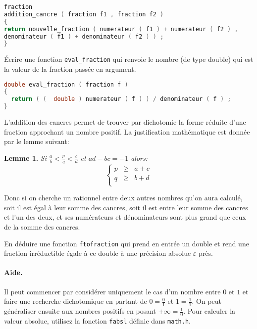 \begin{solutioncachee}
  \begin{lstlisting}[language=C]
fraction
addition_cancre ( fraction f1 , fraction f2 )
{
return nouvelle_fraction ( numerateur ( f1 ) + numerateur ( f2 ) ,
denominateur ( f1 ) + denominateur ( f2 ) ) ;
}
\end{lstlisting}
\end{solutioncachee}

\question Écrire une fonction \texttt{eval\_fraction} qui renvoie le
nombre (de type double) qui est la valeur de la fraction passée en
argument.
\begin{solutioncachee}
  \begin{lstlisting}[language=C]
double eval_fraction ( fraction f ) 
{ 
  return ( (  double ) numerateur ( f ) ) / denominateur ( f ) ; 
}
\end{lstlisting}
\end{solutioncachee}


L’addition des cancres permet de trouver par dichotomie la forme réduite d’une fraction
approchant un nombre positif. La justification mathématique est donnée par le lemme suivant:
\begin{trivlist}
\item \textbf{Lemme 1.} \em
Si \(\frac ab < \frac pq < \frac cd\) et \(ad-bc = -1\) alors:
\[
  \left\lbrace
    \begin{array}{rcl}
      p&\ge&a+c\\
      q&\ge&b+d\\
    \end{array}
  \right.
\]
\end{trivlist}

Donc si on cherche un rationnel entre deux autres nombres qu’on aura calculé, soit il est
égal à leur somme des cancres, soit il est entre leur somme des cancres et l’un des deux, et ses
numérateurs et dénominateurs sont plus grand que ceux de la somme des cancres.


\question En déduire une fonction \texttt{ftofraction} qui prend en
entrée un double et rend une fraction irréductible égale à ce double à
une précision absolue \(\varepsilon\) près.  
\paragraph{Aide.} Il peut commencer par considérer uniquement
le cas d’un nombre entre \(0\) et \(1\)  et faire une recherche
dichotomique en partant de \(0 = \frac 01\) et \(1 = \frac 11\). On peut généraliser ensuite aux nombres positifs en posant \(+\infty=\frac 10\).  
 Pour
calculer la valeur absolue, utilisez la fonction \texttt{fabsl} définie dans
\texttt{math.h}.  

